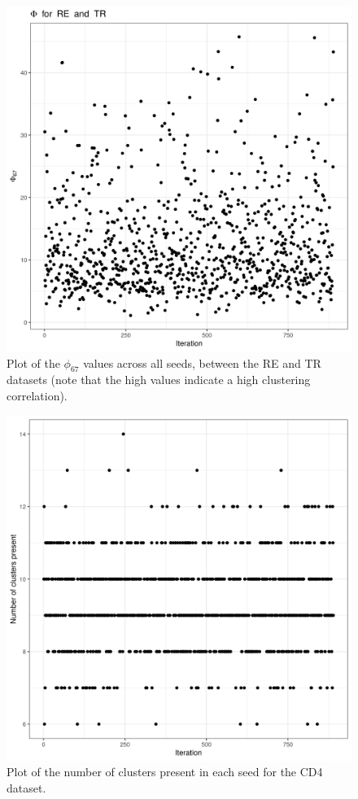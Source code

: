 \documentclass[12pt]{article} %
\begin{document}
	\newpage
		
	\begin{figure}[h]
		\centering
		\includegraphics[scale=0.75]{Images/Biology_data/All_datasets/Phi_series_plots/file_1_Phi_67.png}
		\caption{Plot of the $\phi_{67}$ values across all seeds, between the RE and TR datasets (note that the high values indicate a high clustering correlation).}
		\label{fig:mdi_re_tr_phi_series_plot}
	\end{figure}

	\newpage

	\begin{figure}[h]
		\centering
		\includegraphics[scale=0.75]{Images/Biology_data/All_datasets/Cluster_series_plots/CD4.png}
		\caption{Plot of the number of clusters present in each seed for the CD4 dataset.}
		\label{fig:mdi_cd4_number_clusters_plot}
	\end{figure}
	
\end{document}
